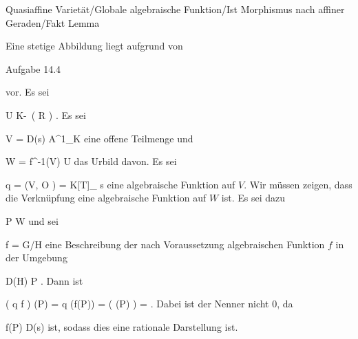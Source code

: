 {Quasiaffine Varietät/Globale algebraische Funktion/Ist Morphismus nach affiner Geraden/Fakt}
{Lemma}
{}
{



\faktsituation {}
\faktzusatz {}
\faktzusatz {}





}
{





Eine stetige Abbildung liegt aufgrund von

Aufgabe 14.4

vor. Es sei

\mavergleichskette
{\vergleichskette
{ U
}
{ \subseteq }{ K\!-\!\, \left(  R  \right)
}
{  }{
}
{    }{
}
{   }{
}
}
{}{}{.}
Es sei

\mavergleichskette
{\vergleichskette
{ V
}
{ = }{ D(s)
}
{ \subseteq }{ {\mathbb A}^{1}_{K}
}
{    }{
}
{   }{
}
}
{}{}{}
eine offene Teilmenge und

\mavergleichskette
{\vergleichskette
{ W
}
{ = }{ f^{-1}(V)
}
{ \subseteq }{ U
}
{    }{
}
{   }{
}
}
{}{}{}
das Urbild davon. Es sei

\mavergleichskettedisp
{\vergleichskette
{ q
}
{ =} { {  }
}
{ \in} { \Gamma (V, {\mathcal O} )
}
{ =} { K[T]_{ s }
}
{ } {
}
}
{}{}{}
eine algebraische Funktion auf $V$. Wir müssen zeigen, dass die Verknüpfung
 eine algebraische Funktion auf $W$ ist. Es sei dazu

\mavergleichskette
{\vergleichskette
{ P
}
{ \in }{ W
}
{  }{
}
{    }{
}
{   }{
}
}
{}{}{}
und sei

\mavergleichskette
{\vergleichskette
{ f
}
{ = }{ G/H
}
{  }{
}
{    }{
}
{   }{
}
}
{}{}{}
eine Beschreibung der nach Voraussetzung algebraischen Funktion $f$ in der Umgebung

\mavergleichskette
{\vergleichskette
{ D(H)
}
{ \ni }{ P
}
{  }{
}
{    }{
}
{   }{
}
}
{}{}{.}
Dann ist

\mavergleichskettedisp
{\vergleichskette
{ ( q \circ f ) (P)
}
{ =} { q (f(P))
}
{ =} {  \left(   (P)  \right)
}
{ =} { 
}
{ } {
}
}
{}{}{.}
Dabei ist der Nenner
 nicht $0$, da

\mavergleichskette
{\vergleichskette
{ f(P)
}
{ \in }{  D(s)
}
{  }{
}
{    }{
}
{   }{
}
}
{}{}{}
ist, sodass dies eine rationale Darstellung ist.




}






